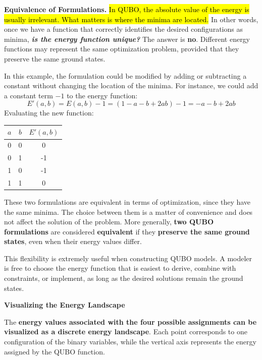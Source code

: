 \highspace
\textcolor{Red2}{ \textbf{Equivalence of Formulations.}} \hl{In QUBO, the absolute value of the energy is usually irrelevant. What matters is where the minima are located.} In other words, once we have a function that correctly identifies the desired configurations as minima, \emph{\textbf{is the energy function unique?}} The answer is \textbf{no}. Different energy functions may represent the same optimization problem, provided that they preserve the same ground states.

\highspace
In this example, the formulation could be modified by adding or subtracting a constant without changing the location of the minima. For instance, we could add a constant term $-1$ to the energy function:
\begin{equation*}
    E'(a, b) = E(a, b) - 1 = (1 - a - b + 2ab) - 1 = - a - b + 2ab
\end{equation*}
Evaluating the new function:
\begin{table}[!htp]
    \centering
    \begin{tabular}{@{} c c | c @{}}
        \toprule
        $a$ & $b$ & $E'(a, b)$ \\
        \midrule
        0 & 0 & 0 \\
        0 & 1 & -1 \\
        1 & 0 & -1 \\
        1 & 1 & 0 \\
        \bottomrule
    \end{tabular}
\end{table}

\noindent
These two formulations are equivalent in terms of optimization, since they have the same minima. The choice between them is a matter of convenience and does not affect the solution of the problem. More generally, \textbf{two QUBO formulations} are considered \textbf{equivalent} if they \textbf{preserve the same ground states}, even when their energy values differ.

\highspace
This flexibility is extremely useful when constructing QUBO models. A modeler is free to choose the energy function that is easiest to derive, combine with constraints, or implement, as long as the desired solutions remain the ground states.

\highspace
\begin{flushleft}
    \textcolor{Green3}{ \textbf{Visualizing the Energy Landscape}}
\end{flushleft}
The \textbf{energy values associated with the four possible assignments can be visualized as a discrete energy landscape}. Each point corresponds to one configuration of the binary variables, while the vertical axis represents the energy assigned by the QUBO function.


